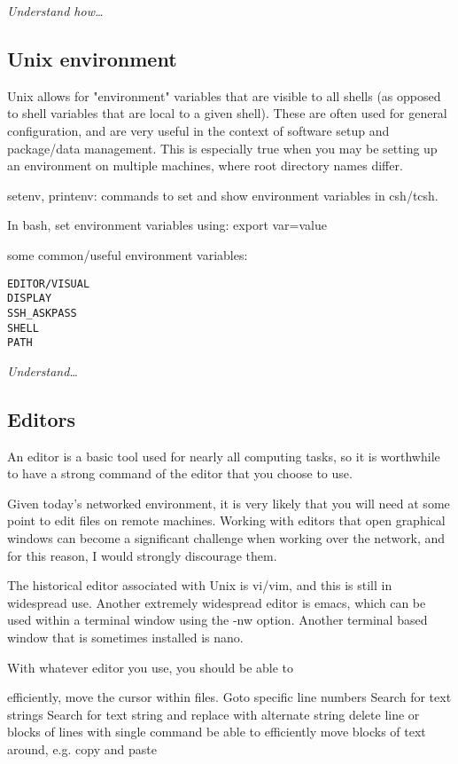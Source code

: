 \documentclass{article}
\newcommand{\test}[1]{%
    \begin{center}
        \colorbox{hl}{\parbox{0.9\textwidth}{\emph{\centering #1}}}
    \end{center}}
\begin{document}
\test{Understand how\ldots}

\subsection{Unix environment}

Unix allows for "environment" variables that are visible to all shells
(as opposed to shell variables that are local to a given shell). These
are often used for general configuration, and are very useful in the
context of software setup and package/data management. This is
especially true when you may be setting up an environment on multiple
machines, where root directory names differ.

setenv, printenv: commands to set and show environment variables in
csh/tcsh.

In bash, set environment variables using: export var=value

some common/useful environment variables:
\begin{verbatim}
EDITOR/VISUAL
DISPLAY
SSH_ASKPASS
SHELL
PATH
\end{verbatim}

\test{Understand\ldots}

\subsection{Editors}
An editor is a basic tool used for nearly all computing tasks, so it
is worthwhile to have a strong command of the editor that you choose
to use.

Given today's networked environment, it is very likely that you will
need at some point to edit files on remote machines. Working with
editors that open graphical windows can become a significant challenge
when working over the network, and for this reason, I would strongly
discourage them.

The historical editor associated with Unix is vi/vim, and this is
still in widespread use. Another extremely widespread editor is emacs,
which can be used within a terminal window using the -nw option.
Another terminal based window that is sometimes installed is nano.

With whatever editor you use, you should be able to

efficiently, move the cursor within files. Goto specific line numbers
Search for text strings
Search for text string and replace with alternate string
delete line or blocks of lines with single command
be able to efficiently move blocks of text around, e.g. copy and paste
\end{document}

